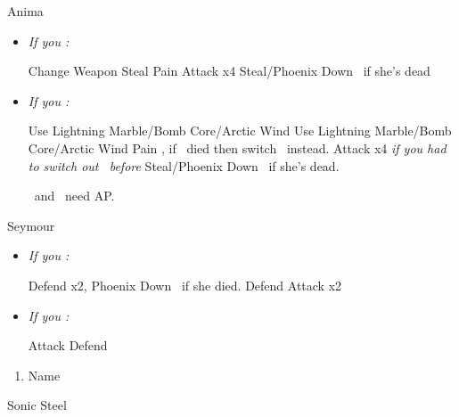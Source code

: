 \vfill
\begin{battle}[18000]{Anima}
\begin{itemize}
\item \textit{If you \wonblitz:}
  \begin{itemize}
    \switch{\tidus}{\wakka}
    \wakkaf Change Weapon
            \kimahrif Steal
          \enemyf Pain
          \tidusf Attack x4
          \rikkuf Steal/Phoenix Down \yuna\ if she's dead
  \end{itemize}
  \item \textit{If you \lostblitz:}
  \begin{itemize}
  \rikkuf Use Lightning Marble/Bomb Core/Arctic Wind
  \switch{\tidus}{\wakka}
  \kimahrif Use Lightning Marble/Bomb Core/Arctic Wind
  \enemyf Pain
  \switch{\wakka}{\tidus}, if \wakka\ died then switch \rikku\ instead.
  \tidusf Attack x4
  \switch{\kimahri}{\rikku} \textit{if you had to switch out \rikku\ before}
  \rikkuf Steal/Phoenix Down \yuna\ if she's dead.
  \end{itemize}
 \tidus\ and \yuna\ need AP.
\end{itemize}
\end{battle}
\vfill
\begin{battle}[6000]{Seymour}
  \begin{itemize}
  \item \textit{If you \wonblitz:}
  \begin{itemize}
    \tidusf Defend x2, Phoenix Down \rikku\ if she died.
    \rikkuf Defend
    \tidusf Attack x2
    \end{itemize}
    \item \textit{If you \lostblitz:}
    \begin{itemize}
    \tidusf Attack
    \rikkuf Defend
    \end{itemize}
  \end{itemize}
\end{battle}
\begin{enumerate}[resume]
  \item Name \shiva
\end{enumerate}
\begin{equip}
\begin{itemize}
\tidusf Sonic Steel
\end{itemize}
\end{equip}
